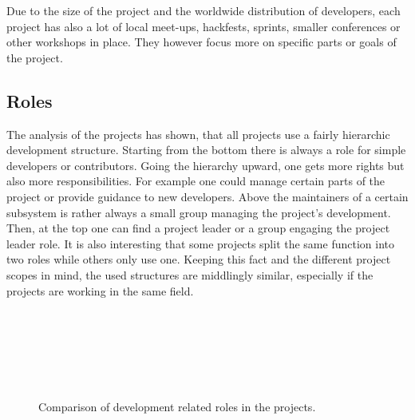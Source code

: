 Due to the size of the project and the worldwide distribution of developers,
each project has also a lot of local meet-ups, hackfests, sprints, smaller
conferences or other workshops in place. They however focus more on specific
parts or goals of the project.


\subsection{Roles} %

The analysis of the projects has shown, that all projects use a fairly
hierarchic development structure. Starting from the bottom there is always a
role for simple developers or contributors. Going the hierarchy upward, one
gets more rights but also more responsibilities. For example one could manage
certain parts of the project or provide guidance to new developers. Above the
maintainers of a certain subsystem is rather always a small group managing the
project's development. Then, at the top one can find a project leader or a
group engaging the project leader role. It is also interesting that some
projects split the same function into two roles while others only use one.
Keeping this fact and the different project scopes in mind, the used structures
are middlingly similar, especially if the projects are working in the same
field.

\begin{figure}[htbp]
  \centering
   \qquad
   \\

   \qquad
   \\

   \qquad
   \\

   \qquad
   \\

   \qquad
   \\
  \caption{Comparison of development related roles in the projects.}
\end{figure}

